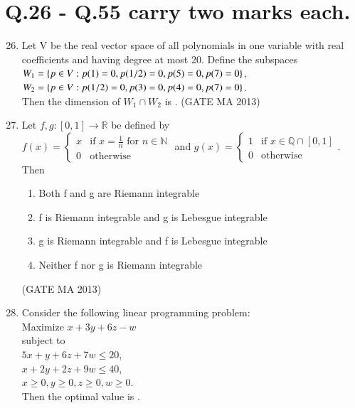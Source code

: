 \documentclass[journal,12pt,onecolumn]{IEEEtran}
\theoremstyle{remark}
\begin{document}
\section*{Q.26 - Q.55 carry two marks each.}
\begin{enumerate}
    \setcounter{enumi}{25}
    \item Let V be the real vector space of all polynomials in one variable with real coefficients and having degree at most 20. Define the subspaces \\
    $W_1 = \left\{p \in V : p(1)=0, p(1/2)=0, p(5)=0, p(7)=0\right\}$, \\
    $W_2 = \left\{p \in V : p(1/2)=0, p(3)=0, p(4)=0, p(7)=0\right\}$. \\
    Then the dimension of $W_1 \cap W_2$ is \underline{\hspace{1cm}}.
    \hfill (GATE MA 2013)
    \item Let $f, g: [0,1] \rightarrow \mathbb{R}$ be defined by \\
    $f(x) = \begin{cases} x & \text{if } x = \frac{1}{n} \text{ for } n \in \mathbb{N} \\ 0 & \text{otherwise} \end{cases}$ and $g(x) = \begin{cases} 1 & \text{if } x \in \mathbb{Q} \cap [0,1] \\ 0 & \text{otherwise} \end{cases}$. \\
    Then
    \begin{enumerate}
        \item Both f and g are Riemann integrable
        \item f is Riemann integrable and g is Lebesgue integrable
        \item g is Riemann integrable and f is Lebesgue integrable
        \item Neither f nor g is Riemann integrable
    \end{enumerate}
    \hfill (GATE MA 2013)
    \item Consider the following linear programming problem: \\
    Maximize $x+3y+6z-w$ \\
    subject to \\
    $5x+y+6z+7w \le 20$, \\
    $x+2y+2z+9w \le 40$, \\
    $x \ge 0, y \ge 0, z \ge 0, w \ge 0$. \\
    Then the optimal value is \underline{\hspace{1cm}}.

\end{enumerate}
\end{document}
